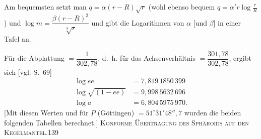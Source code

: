 \par\endgroup
Am bequemsten setzt man $q=\alpha(r-R)\sqrt r$ (wohl ebenso bequem $q=\alpha'r\log\frac rR$) und $\log m=\dfrac{\beta(r-R)^2}{\sqrt[3]r}$ und gibt die Logarithmen von $\alpha$ [und $\beta$] in einer Tafel an.

Für die Abplattung $=\dfrac1{302{,}78}$, d.~h. für das Achsenverhältnis $=\dfrac{301{,}78}{302{,}78}$, ergibt sich [vgl. S.~69]
\[
\begin{aligned}
\log ee&=7{,}819\,1850\,399\\
\log\sqrt{(1-ee)}&=9{,}998\,5632\,696\\
\log a&=6{,}804\,5975\,970.
\end{aligned}
\]
[Mit diesen Werten und für $P$ (Göttingen) $=51^\circ31'48''{,}7$ wurden die beiden folgenden Tabellen berechnet.]
\clearpage
\noindent\mbox{}\hfill{\small\textsc{Konforme Übertragung des Sphäroids auf den Kegelmantel.}}\hfill139\par\bigskip
